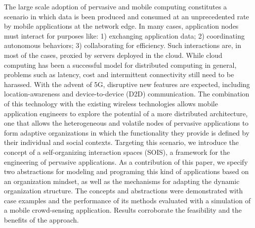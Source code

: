 The large scale adoption of pervasive and mobile computing constitutes a scenario in which data is been produced and consumed at an unprecedented rate by mobile applications at the network edge. In many cases, application nodes must interact for purposes like: 1) exchanging application data; 2) coordinating autonomous behaviors; 3) collaborating for efficiency. 
Such interactions are, in most of the cases, proxied by servers deployed in the cloud. While cloud computing has been a successful model for distributed computing in general, problems such as latency, cost and intermittent connectivity still need to be harassed. With the advent of 5G, disruptive new features are expected, including location-awareness and device-to-device (D2D) communication. The combination of this technology with the existing wireless technologies allows mobile application engineers to explore the potential of a more distributed architecture, one that allows the heterogeneous and volatile nodes of pervasive applications 
to form adaptive organizations in which the functionality they provide is defined by their individual and social contexts. Targeting this scenario, we introduce the concept of a self-organizing interaction spaces (SOIS), a framework for the engineering of pervasive applications. As a contribution of this paper, we specify two abstractions for modeling and programing this kind of applications based on an organization mindset, as well as the mechanisms for adapting the dynamic organization structure. 
The concepts and abstractions were demonstrated with case examples and the performance of its methods evaluated with a simulation of a mobile crowd-sensing application. Results corroborate the feasibility and the benefits of the approach. 






